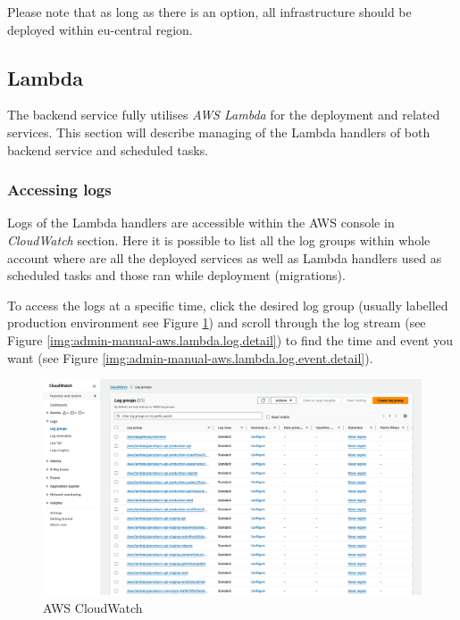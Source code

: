 Please note that as long as there is an option, all infrastructure should be deployed within eu-central region.

\subsection{Lambda}
The backend service fully utilises \textit{AWS Lambda} for the deployment and related services. 
This section will describe managing of the Lambda handlers of both backend service and scheduled tasks.


\subsubsection{Accessing logs}
Logs of the Lambda handlers are accessible within the AWS console in \textit{CloudWatch} section.
Here it is possible to list all the log groups within whole account where are all the deployed services as well as Lambda handlers used as scheduled tasks and those ran while deployment (migrations).

To access the logs at a specific time, click the desired log group (usually labelled production environment see Figure \ref{img:admin-manual-aws.lambda.log}) and scroll through the log stream (see Figure \ref{img:admin-manual-aws.lambda.log.detail}) to find the time and event you want (see Figure \ref{img:admin-manual-aws.lambda.log.event.detail}).

\begin{figure}[H]\centering
\includegraphics[width=140mm]{img/docs/fig_aws_cloudwatch.png}
\caption{AWS CloudWatch}
\label{img:admin-manual-aws.lambda.log}
\end{figure}

